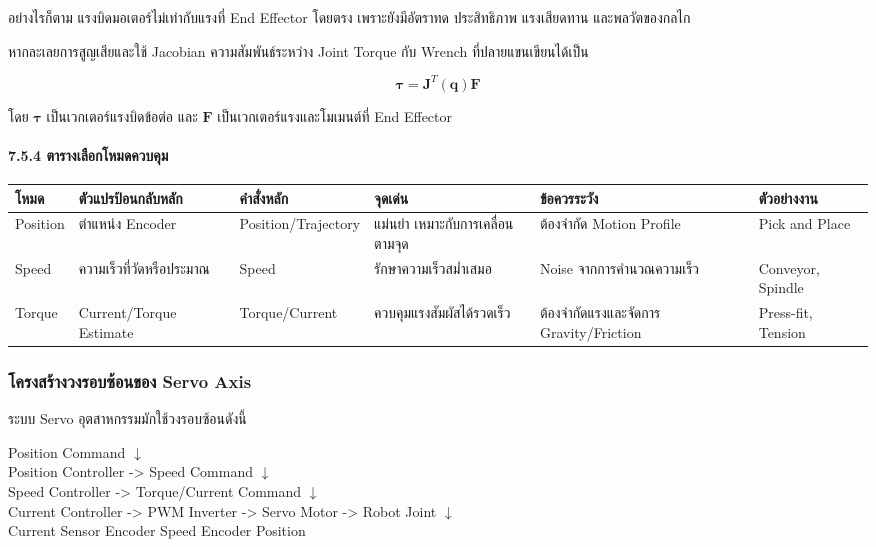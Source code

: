 อย่างไรก็ตาม แรงบิดมอเตอร์ไม่เท่ากับแรงที่ End Effector โดยตรง เพราะยังมีอัตราทด ประสิทธิภาพ แรงเสียดทาน และพลวัตของกลไก

หากละเลยการสูญเสียและใช้ Jacobian ความสัมพันธ์ระหว่าง Joint Torque กับ Wrench ที่ปลายแขนเขียนได้เป็น

\[
\boldsymbol{\tau}=\mathbf{J}^T(\mathbf{q})\mathbf{F}
\]

โดย $\boldsymbol{\tau}$ เป็นเวกเตอร์แรงบิดข้อต่อ และ $\mathbf{F}$ เป็นเวกเตอร์แรงและโมเมนต์ที่ End Effector

\paragraph{7.5.4 ตารางเลือกโหมดควบคุม}

\begin{table}[htbp]
    \centering
    \small
    \begin{tabularx}{\textwidth}{@{}L{0.12\textwidth} L{0.17\textwidth} L{0.14\textwidth} X X L{0.14\textwidth}@{}}
        \hline
        \textbf{โหมด} & \textbf{ตัวแปรป้อนกลับหลัก} & \textbf{คำสั่งหลัก} & \textbf{จุดเด่น} & \textbf{ข้อควรระวัง} & \textbf{ตัวอย่างงาน} \\
        \hline
        Position & ตำแหน่ง Encoder & Position/Trajectory & แม่นยำ เหมาะกับการเคลื่อนตามจุด & ต้องจำกัด Motion Profile & Pick and Place \\
        Speed & ความเร็วที่วัดหรือประมาณ & Speed & รักษาความเร็วสม่ำเสมอ & Noise จากการคำนวณความเร็ว & Conveyor, Spindle \\
        Torque & Current/Torque Estimate & Torque/Current & ควบคุมแรงสัมผัสได้รวดเร็ว & ต้องจำกัดแรงและจัดการ Gravity/Friction & Press-fit, Tension \\
        \hline
    \end{tabularx}
\end{table}



\subsubsection{โครงสร้างวงรอบซ้อนของ Servo Axis}

ระบบ Servo อุตสาหกรรมมักใช้วงรอบซ้อนดังนี้

\begin{center}
Position Command
$\downarrow$ \\
Position Controller -> Speed Command
$\downarrow$ \\
Speed Controller -> Torque/Current Command
$\downarrow$ \\
Current Controller -> PWM Inverter -> Servo Motor -> Robot Joint
$\downarrow$ \\
Current Sensor      Encoder Speed    Encoder Position
\end{center}

